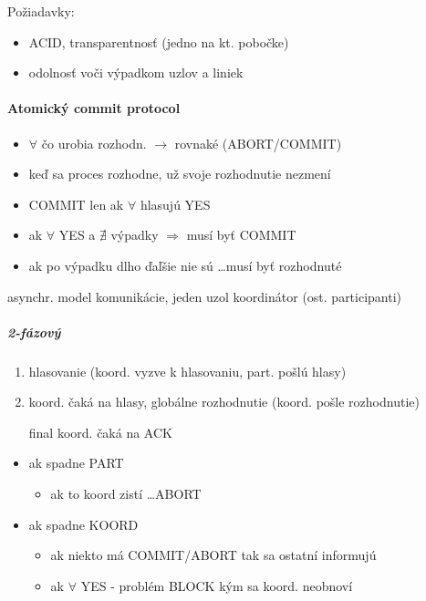 \documentclass[a4paper]{report}
\begin{document}
Požiadavky:

\begin{itemize}
 \item ACID, transparentnosť (jedno na kt. pobočke)
 \item odolnosť voči výpadkom uzlov a liniek
\end{itemize}

\paragraph{Atomický commit protocol}

\begin{itemize}
 \item $\forall$ čo urobia rozhodn. $\rightarrow$ rovnaké (ABORT/COMMIT)
 \item keď sa proces rozhodne, už svoje rozhodnutie nezmení
 \item COMMIT len ak $\forall$ hlasujú YES
 \item ak $\forall$ YES a $\nexists$ výpadky $\Rightarrow$ musí byť COMMIT
 \item ak po výpadku dlho ďaľšie nie sú \ldots musí byť rozhodnuté
\end{itemize}

\noindent
asynchr. model komunikácie, jeden uzol koordinátor (ost. participanti)

\subparagraph*{2-fázový}
\begin{enumerate}
 \item hlasovanie (koord. vyzve k hlasovaniu, part. pošlú hlasy)
 \item koord. čaká na hlasy, globálne rozhodnutie (koord. pošle rozhodnutie)
 \item[final] koord. čaká na ACK
\end{enumerate}

\begin{itemize}
 \item ak spadne PART
 \begin{itemize}
  \item ak to koord zistí \ldots ABORT
 \end{itemize}
 \item ak spadne KOORD
 \begin{itemize}
  \item ak niekto má COMMIT/ABORT tak sa ostatní informujú
  \item ak $\forall$ YES - problém BLOCK kým sa koord. neobnoví
 \end{itemize}
\end{itemize}
\end{document}
